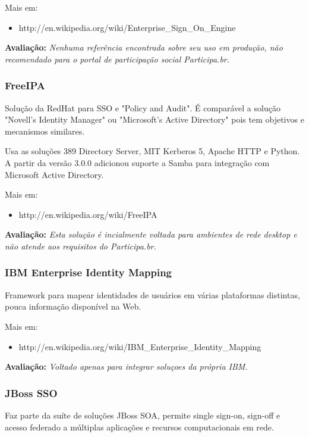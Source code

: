 \documentclass[11pt]{article}
\begin{document}
Mais em:
\begin{itemize}
  \item{http://en.wikipedia.org/wiki/Enterprise\_Sign\_On\_Engine}
\end{itemize}

{\bf Avaliação:} {\it Nenhuma referência encontrada sobre seu uso em produção,
não recomendado para o portal de participação social Participa.br.}

\subsubsection{FreeIPA}

Solução da RedHat para SSO e "Policy and Audit". É comparável a solução
"Novell's Identity Manager" ou "Microsoft's Active Directory" pois tem
objetivos e mecanismos similares.

Usa as soluções 389 Directory Server, MIT Kerberos 5, Apache HTTP e Python. A
partir da versão 3.0.0 adicionou suporte a Samba para integração com Microsoft
Active Directory.

Mais em:
\begin{itemize}
  \item{http://en.wikipedia.org/wiki/FreeIPA}
\end{itemize}

{\bf Avaliação:} {\it Esta solução é incialmente voltada para ambientes de
rede desktop e não atende aos requisitos do Participa.br.}

\subsubsection{IBM Enterprise Identity Mapping}

Framework para mapear identidades de usuários em várias plataformas distintas,
pouca informação disponível na Web.

Mais em:
\begin{itemize}
  \item{http://en.wikipedia.org/wiki/IBM\_Enterprise\_Identity\_Mapping}
\end{itemize}

{\bf Avaliação:} {\it Voltado apenas para integrar soluçoes da própria
IBM.}

\subsubsection{JBoss SSO}

Faz parte da suíte de soluções JBoss SOA, permite single sign-on, sign-off e
acesso federado a múltiplas aplicações e recursos computacionais em rede.
\end{document}
